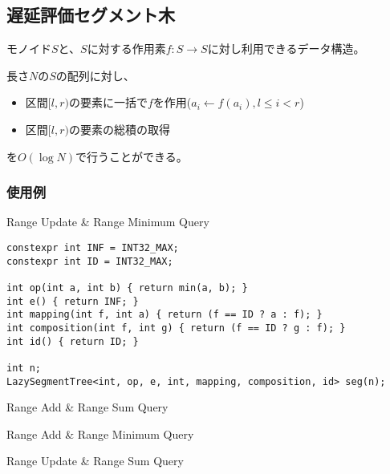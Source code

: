 \subsection{遅延評価セグメント木}

モノイド$S$と、$S$に対する作用素$f:S \rightarrow S$に対し利用できるデータ構造。

長さ$N$の$S$の配列に対し、
%
\begin{itemize}
    \item 区間$[l,r)$の要素に一括で$f$を作用($a_i \leftarrow f(a_i), l \le i < r$)
    \item 区間$[l,r)$の要素の総積の取得
\end{itemize}
%
を$O(\log N)$で行うことができる。



\subsubsection{使用例}

Range Update \& Range Minimum Query

\begin{lstlisting}
constexpr int INF = INT32_MAX;
constexpr int ID = INT32_MAX;

int op(int a, int b) { return min(a, b); }
int e() { return INF; }
int mapping(int f, int a) { return (f == ID ? a : f); }
int composition(int f, int g) { return (f == ID ? g : f); }
int id() { return ID; }

int n;
LazySegmentTree<int, op, e, int, mapping, composition, id> seg(n);
\end{lstlisting}

Range Add \& Range Sum Query

Range Add \& Range Minimum Query

Range Update \& Range Sum Query
